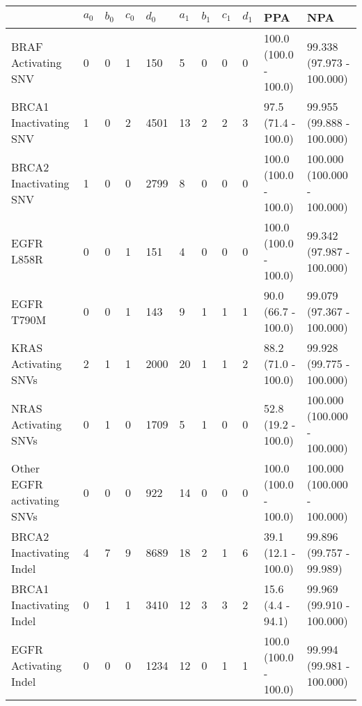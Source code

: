 \begin{tabular}{|l|l|l|l|l|l|l|l|l|l|l|}
\hline
\rowcolor[gray]{.85}{}                           & \textbf{$a_0$} & \textbf{$b_0$} & \textbf{$c_0$} & \textbf{$d_0$} & \textbf{$a_1$} & \textbf{$b_1$} & \textbf{$c_1$} & \textbf{$d_1$} & \textbf{PPA} & \textbf{                          NPA }\\ \hline
BRAF Activating SNV         &      0 &      0 &      1 &    150 &      5 &      0 &      0 &      0 &  100.0 (100.0 - 100.0) &    99.338 (97.973 - 100.000) \\ \hline
BRCA1 Inactivating SNV      &      1 &      0 &      2 &   4501 &     13 &      2 &      2 &      3 &    97.5 (71.4 - 100.0) &    99.955 (99.888 - 100.000) \\ \hline
BRCA2 Inactivating SNV      &      1 &      0 &      0 &   2799 &      8 &      0 &      0 &      0 &  100.0 (100.0 - 100.0) &  100.000 (100.000 - 100.000) \\ \hline
EGFR L858R                  &      0 &      0 &      1 &    151 &      4 &      0 &      0 &      0 &  100.0 (100.0 - 100.0) &    99.342 (97.987 - 100.000) \\ \hline
EGFR T790M                  &      0 &      0 &      1 &    143 &      9 &      1 &      1 &      1 &    90.0 (66.7 - 100.0) &    99.079 (97.367 - 100.000) \\ \hline
KRAS Activating SNVs        &      2 &      1 &      1 &   2000 &     20 &      1 &      1 &      2 &    88.2 (71.0 - 100.0) &    99.928 (99.775 - 100.000) \\ \hline
NRAS Activating SNVs        &      0 &      1 &      0 &   1709 &      5 &      1 &      0 &      0 &    52.8 (19.2 - 100.0) &  100.000 (100.000 - 100.000) \\ \hline
Other EGFR activating SNVs  &      0 &      0 &      0 &    922 &     14 &      0 &      0 &      0 &  100.0 (100.0 - 100.0) &  100.000 (100.000 - 100.000) \\ \hline
BRCA2 Inactivating Indel    &      4 &      7 &      9 &   8689 &     18 &      2 &      1 &      6 &    39.1 (12.1 - 100.0) &     99.896 (99.757 - 99.989) \\ \hline
BRCA1 Inactivating Indel    &      0 &      1 &      1 &   3410 &     12 &      3 &      3 &      2 &      15.6 (4.4 - 94.1) &    99.969 (99.910 - 100.000) \\ \hline
EGFR Activating Indel       &      0 &      0 &      0 &   1234 &     12 &      0 &      1 &      1 &  100.0 (100.0 - 100.0) &    99.994 (99.981 - 100.000) \\ \hline

\end{tabular}
